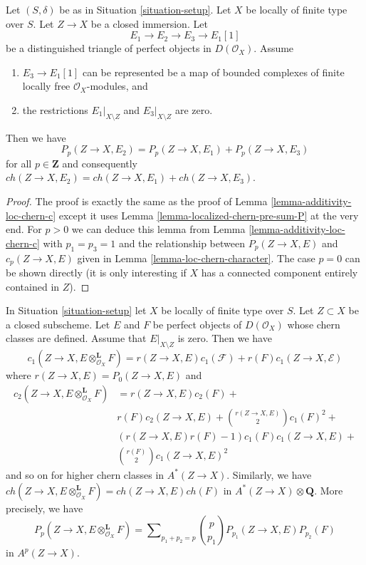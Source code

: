 \begin{lemma}
\label{lemma-additivity-loc-chern-P}
Let $(S, \delta)$ be as in Situation \ref{situation-setup}.
Let $X$ be locally of finite type over $S$. Let $Z \to X$ be
a closed immersion. Let
$$
E_1 \to E_2 \to E_3 \to E_1[1]
$$
be a distinguished triangle of perfect objects in $D(\mathcal{O}_X)$.
Assume
\begin{enumerate}
\item $E_3 \to E_1[1]$ can be represented be a map of bounded complexes
of finite locally free $\mathcal{O}_X$-modules, and
\item the restrictions $E_1|_{X \setminus Z}$ and $E_3|_{X \setminus Z}$
are zero.
\end{enumerate}
Then we have
$$
P_p(Z \to X, E_2) = P_p(Z \to X, E_1) + P_p(Z \to X, E_3)
$$
for all $p \in \mathbf{Z}$ and consequently
$ch(Z \to X, E_2) = ch(Z \to X, E_1) + ch(Z \to X, E_3)$.
\end{lemma}

\begin{proof}
The proof is exactly the same as the proof of
Lemma \ref{lemma-additivity-loc-chern-c}
except it uses
Lemma \ref{lemma-localized-chern-pre-sum-P}
at the very end. For $p > 0$ we can deduce this lemma
from Lemma \ref{lemma-additivity-loc-chern-c} with $p_1 = p_3 = 1$
and the relationship between $P_p(Z \to X, E)$ and $c_p(Z \to X, E)$ given in
Lemma \ref{lemma-loc-chern-character}. The case $p = 0$ can be shown
directly (it is only interesting if $X$ has a connected component
entirely contained in $Z$).
\end{proof}

\begin{lemma}
\label{lemma-loc-chern-tensor-product}
In Situation \ref{situation-setup} let $X$ be locally of finite type over $S$.
Let $Z \subset X$ be a closed subscheme. Let $E$ and $F$ be perfect objects
of $D(\mathcal{O}_X)$ whose chern classes are defined. Assume
that $E|_{X \setminus Z}$ is zero. Then we have
$$
c_1(Z \to X, E \otimes_{\mathcal{O}_X}^\mathbf{L} F) =
r(Z \to X, E) c_1(\mathcal{F}) + r(F) c_1(Z \to X, \mathcal{E})
$$
where $r(Z \to X, E) = P_0(Z \to X, E)$ and
\begin{align*}
c_2(Z \to X, E \otimes_{\mathcal{O}_X}^\mathbf{L} F)
& =
r(Z \to X, E) c_2(F) + \\
& r(F) c_2(Z \to X, E) + {r(Z \to X, E) \choose 2} c_1(F)^2 + \\
& (r(Z \to X, E)r(F) - 1) c_1(F)c_1(Z \to X, E) + \\
& {r(F) \choose 2} c_1(Z \to X, E)^2
\end{align*}
and so on for higher chern classes in $A^*(Z \to X)$. Similarly, we have
$ch(Z \to X, E \otimes_{\mathcal{O}_X}^\mathbf{L} F) =
ch(Z \to X, E) ch(F)$ in $A^*(Z \to X) \otimes \mathbf{Q}$.
More precisely, we have
$$
P_p(Z \to X, E \otimes_{\mathcal{O}_X}^\mathbf{L} F) =
\sum\nolimits_{p_1 + p_2 = p}
{p \choose p_1} P_{p_1}(Z \to X, E) P_{p_2}(F)
$$
in $A^p(Z \to X)$.
\end{lemma}


